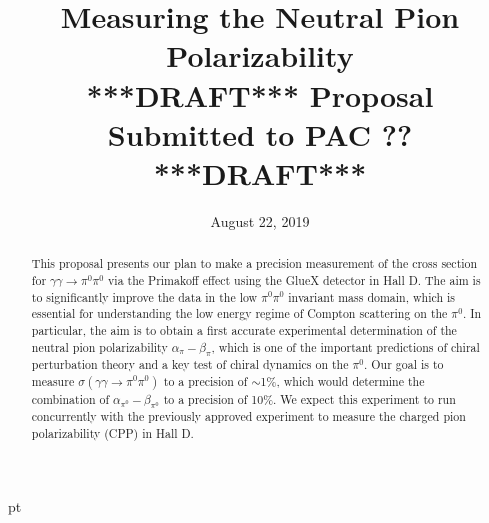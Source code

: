 \documentclass[letterpaper,12pt]{article}
\date{August 22, 2019}
\title{\Large \textbf{Measuring the Neutral Pion Polarizability}\\
\large{***DRAFT*** Proposal Submitted to PAC ?? ***DRAFT***}
}
\begin{document}
\setlength{\parindent}{0in}


\maketitle

\thispagestyle{empty}


\begin{abstract}
This proposal presents our plan to make a precision measurement of the cross section for $\gamma \gamma \rightarrow \pi^0 \pi^0$ via the Primakoff effect using the GlueX detector in Hall D. The aim is to significantly improve the data in the low $\pi^0\pi^0$ invariant mass domain, which is essential for understanding the low energy regime of Compton scattering on the $\pi^0$. In particular, the aim is to obtain a first accurate experimental determination of the neutral pion polarizability $\alpha_\pi - \beta_\pi$, which is one of the important predictions of chiral perturbation theory and a key test of chiral dynamics on the $\pi^0$.  Our goal is to measure $\sigma(\gamma\gamma\rightarrow\pi^0\pi^0)$ to a precision of $\sim$1\%, which would determine the combination of $\alpha_{\pi^0}-\beta_{\pi^0}$ to a precision of 10\%. We expect this experiment to run concurrently with the previously approved experiment to measure the charged pion polarizability (CPP) \cite{CPPexp} in Hall D.
\end{abstract}

\parindent 15pt
 pt
\end{document}
